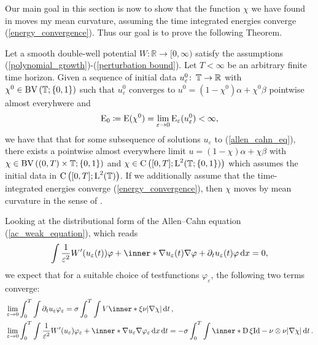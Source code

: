 Our main goal in this section is now to show that the function $ \chi $ we have 
found in  moves my mean curvature, assuming 
the time integrated energies converge (\ref{energy_convergence}). Thus our 
goal is to prove the following Theorem.
\begin{theorem}
	\label{convergence_to_twophase_mcf}
	Let a smooth double-well potential $ W \colon \mathbb{ R } \to [ 0, \infty 
	) 
	$ satisfy the assumptions (\ref{polynomial_growth})-(\ref{perturbation 
		bound}). Let $ T < \infty $ be an arbitrary finite time horizon. Given 
		a 
	sequence of initial data $ u_{ \varepsilon }^{ 0 } \colon \operatorname{\mathbb{T}} \to 
	\mathbb{ R } $ with $ \chi^{ 0 } \in \operatorname{BV} \left( \operatorname{\mathbb{T}} ; \{ 0 , 1 \} 
	\right) 
	$ such that $ u_{ \varepsilon }^{ 0 } $ converges to $ u^{ 0 } = ( 1- 
	\chi^{ 0} ) \alpha 
	+ \chi^{ 0 } \beta $ pointwise almost everyhwere and
	\begin{equation*}
		\operatorname{E}_{ 0 }
		\coloneqq
		\operatorname{E} ( \chi^{ 0 } )
		=
		\lim_{ \varepsilon \to 0 }
		\operatorname{E}_{ \varepsilon } ( u_{ \varepsilon}^{ 0 } )
		< 
		\infty,
	\end{equation*}
	we have that that for some subsequence of solutions $ u_{ \varepsilon } $ 
	to 
	(\ref{allen_cahn_eq}), there exists a pointwise 
	almost everywhere limit $ u = ( 1 - \chi ) \alpha + \chi \beta $ with $ 
	\chi \in \operatorname{BV} \left( ( 0, T ) \times \operatorname{\mathbb{T}} ; \{ 0 , 1 \} \right) $ and
	$ \chi \in \operatorname{C} \left( [ 0 , T ] ; \operatorname{L}^{ 2 } (\operatorname{\mathbb{T}} ; \{ 0 , 1 \} ) 
	\right) $ which assumes the initial data in $ \operatorname{C} \left( [ 0, T ] ; 
	\operatorname{L}^{ 2 }( \operatorname{\mathbb{T}} ) \right) $. If we additionally assume that the 
	time-integrated energies converge (\ref{energy_convergence}), then $ \chi 
	$ moves by mean curvature in the sense of .
\end{theorem} 
Looking at the distributional form of the Allen--Cahn equation 
(\ref{ac_weak_equation}), which reads
\begin{equation*}
	\int
	\frac{ 1 }{ \varepsilon^{ 2 } } W' ( u_{ \varepsilon} ( t ) ) \varphi
	+
	\inner*{ \nabla u_{ \varepsilon } ( t ) }{\nabla \varphi }
	+
	\partial_{ t } u_{ \varepsilon} ( t ) \varphi 
	\dd{x}
	=
	0,
\end{equation*}
we expect that for a suitable choice of testfunctions $ \varphi_{ \varepsilon } 
$, the following two terms converge:
\begin{align*}
	& \lim_{ \varepsilon \to 0 }
	\int_{ 0 }^{ T }
	\int 
	\partial_{ t } u_{ \varepsilon } \varphi_{ \varepsilon }
	=
	\sigma
	\int_{ 0 }^{ T }
	\int
	V \inner*{ \xi }{ \nu }
	\abs{ \nabla \chi }
	\dd{ t },
	\\
	& \lim_{ \varepsilon \to 0 }
	\int_{ 0 }^{ T }
	\int
	\frac{1 }{ \varepsilon^{ 2 } }
	W'( u_{ \varepsilon } )
	\varphi_{ \varepsilon}
	+ 
	\inner*{ \nabla u_{ \varepsilon } }{ \nabla \varphi_{ \varepsilon } }
	\dd{ x }
	\dd{ t }
	=
	- 
	\sigma \int_{ 0 }^{ T }
	\int
	\inner*{ \diff \xi }{ \mathrm{Id} - \nu \otimes \nu }
	\abs{ \nabla \chi }
	\dd{ t }.
\end{align*}
